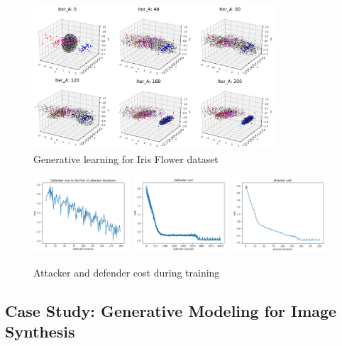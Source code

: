 \documentclass{article}
\begin{document}
\begin{figure}[htb]
\centering
\includegraphics[width=0.8\textwidth]{FIGDRG/flower}
\caption{Generative learning for Iris Flower dataset}
\label{fig:flower}
\end{figure}

\begin{figure}[htb]
\centering
\includegraphics[width=0.32\textwidth]{FIGDRG/defender_cost_10}
\includegraphics[width=0.32\textwidth]{FIGDRG/defender_cost}
\includegraphics[width=0.32\textwidth]{FIGDRG/attacker_cost}
\caption{Attacker and defender cost during training}
\label{fig:flower_cost}
\end{figure}


\subsection{Case Study: Generative Modeling for Image Synthesis}
\end{document}
